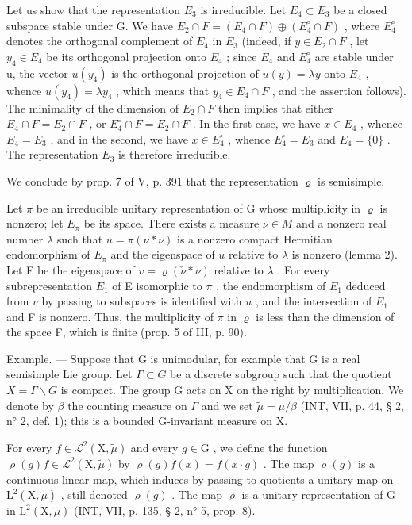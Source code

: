 Let us show that the representation \(E_{3}\) is irreducible. Let \(E_{4} \subset E_{3}\) be a closed subspace stable under G. We have \(E_{2} \cap F = (E_{4} \cap F) \oplus (E_{4}^{\circ} \cap F)\) , where \(E_{4}^{\circ}\) denotes the orthogonal complement of \(E_{4}\) in \(E_{3}\) (indeed, if \(y \in E_{2} \cap F\) , let \(y_{4} \in E_{4}\) be its orthogonal projection onto \(E_{4}\) ; since \(E_{4}\) and \(E_{4}^{\circ}\) are stable under u, the vector \(u(y_{4})\) is the orthogonal projection of \(u(y) = \lambda y\) onto \(E_{4}\) , whence \(u(y_{4}) = \lambda y_{4}\) , which means that \(y_{4} \in E_{4} \cap F\) , and the assertion follows). The minimality of the dimension of \(E_{2} \cap F\) then implies that either \(E_{4} \cap F = E_{2} \cap F\) , or \(E_{4}^{\circ} \cap F = E_{2} \cap F\) . In the first case, we have \(x \in E_{4}\) , whence \(E_{4} = E_{3}\) , and in the second, we have \(x \in E_{4}^{\circ}\) , whence \(E_{4}^{\circ} = E_{3}\) and \(E_{4} = \{0\}\) . The representation \(E_{3}\) is therefore irreducible.

We conclude by prop. 7 of V, p. 391 that the representation \(\varrho\) is semisimple.

Let \(\pi\) be an irreducible unitary representation of G whose multiplicity in \(\varrho\) is nonzero; let \(E_{\pi}\) be its space. There exists a measure \(\nu \in M\) and a nonzero real number \(\lambda\) such that \(u = \pi (\check{\nu} * \nu)\) is a nonzero compact Hermitian endomorphism of \(E_{\pi}\) and the eigenspace of \(u\) relative to \(\lambda\) is nonzero (lemma 2). Let F be the eigenspace of \(v = \varrho (\check{\nu} * \nu)\) relative to \(\lambda\) . For every subrepresentation \(E_1\) of E isomorphic to \(\pi\) , the endomorphism of \(E_1\) deduced from \(v\) by passing to subspaces is identified with \(u\) , and the intersection of \(E_1\) and F is nonzero. Thus, the multiplicity of \(\pi\) in \(\varrho\) is less than the dimension of the space F, which is finite (prop. 5 of III, p. 90).

Example. --- Suppose that G is unimodular, for example that G is a real semisimple Lie group. Let \(\Gamma \subset G\) be a discrete subgroup such that the quotient \(X = \Gamma \backslash G\) is compact. The group G acts on X on the right by multiplication. We denote by \(\beta\) the counting measure on \(\Gamma\) and we set \(\widetilde{\mu} = \mu / \beta\) (INT, VII, p. 44, § 2, n° 2, def. 1); this is a bounded G-invariant measure on X.

For every \(f \in \mathcal{L}^2(\mathrm{X},\widetilde{\mu})\) and every \(g \in \mathrm{G}\) , we define the function \(\varrho(g)f \in \mathcal{L}^2(\mathrm{X},\widetilde{\mu})\) by \(\varrho(g)f(x) = f(x \cdot g)\) . The map \(\varrho(g)\) is a continuous linear map, which induces by passing to quotients a unitary map on \(\mathrm{L}^2(\mathrm{X},\widetilde{\mu})\) , still denoted \(\varrho(g)\) . The map \(\varrho\) is a unitary representation of G in \(\mathrm{L}^2(\mathrm{X},\widetilde{\mu})\) (INT, VII, p. 135, § 2, n° 5, prop. 8).

